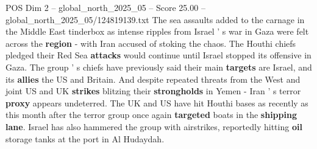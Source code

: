 \begin{textsample}{POS Dim 2 – global\_north\_2025\_05 – Score 25.00 – global\_north\_2025\_05/124819139.txt}
The sea assaults added to the carnage in the Middle East tinderbox as intense ripples from Israel ' s war in Gaza were felt across the \textbf{region} - with Iran accused of stoking the chaos.
The Houthi chiefs pledged their Red Sea \textbf{attacks} would continue until Israel stopped its offensive in Gaza.
The group ' s chiefs have previously said their main \textbf{targets} are Israel, and its \textbf{allies} the US and Britain.
And despite repeated threats from the West and joint US and UK \textbf{strikes} blitzing their \textbf{strongholds} in Yemen - Iran ' s terror \textbf{proxy} appears undeterred.
The UK and US have hit Houthi bases as recently as this month after the terror group once again \textbf{targeted} boats in the \textbf{shipping} \textbf{lane}.
Israel has also hammered the group with airstrikes, reportedly hitting \textbf{oil} storage tanks at the port in Al Hudaydah.

\end{textsample}
